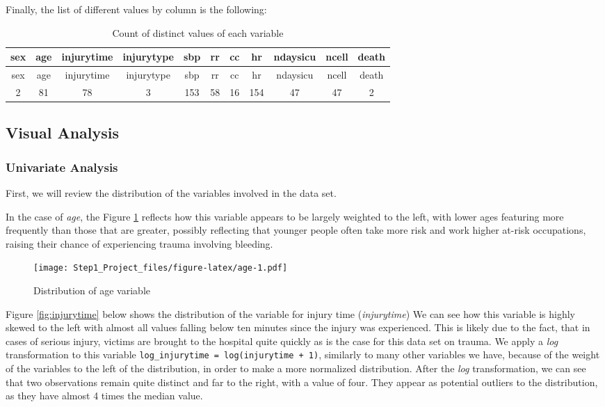 \documentclass[
]{article}
\begin{document}
Finally, the list of different values by column is the following:

\begin{longtable}[]{@{}ccccccccccc@{}}
\caption{Count of distinct values of each variable}\tabularnewline
\toprule
sex & age & injurytime & injurytype & sbp & rr & cc & hr & ndaysicu &
ncell & death\tabularnewline
\midrule
\endfirsthead
\toprule
sex & age & injurytime & injurytype & sbp & rr & cc & hr & ndaysicu &
ncell & death\tabularnewline
\midrule
\endhead
2 & 81 & 78 & 3 & 153 & 58 & 16 & 154 & 47 & 47 & 2\tabularnewline
\bottomrule
\end{longtable}

\newpage

\hypertarget{visual-analysis}{%
\subsection{Visual Analysis}\label{visual-analysis}}

\hypertarget{univariate-analysis}{%
\subsubsection{Univariate Analysis}\label{univariate-analysis}}

First, we will review the distribution of the variables involved in the
data set.

In the case of \emph{age}, the Figure \ref{fig:age} reflects how this
variable appears to be largely weighted to the left, with lower ages
featuring more frequently than those that are greater, possibly
reflecting that younger people often take more risk and work higher
at-risk occupations, raising their chance of experiencing trauma
involving bleeding.

\begin{figure}
\centering
\texttt{[image: Step1\_Project\_files/figure-latex/age-1.pdf]}
\caption{Distribution of age variable\label{fig:age}}
\end{figure}

Figure \ref{fig:injurytime} below shows the distribution of the variable
for injury time (\emph{injurytime}) We can see how this variable is
highly skewed to the left with almost all values falling below ten
minutes since the injury was experienced. This is likely due to the
fact, that in cases of serious injury, victims are brought to the
hospital quite quickly as is the case for this data set on trauma. We
apply a \emph{log} transformation to this variable
\texttt{log\_injurytime\ =\ log(injurytime\ +\ 1)}, similarly to many
other variables we have, because of the weight of the variables to the
left of the distribution, in order to make a more normalized
distribution. After the \emph{log} transformation, we can see that two
observations remain quite distinct and far to the right, with a value of
four. They appear as potential outliers to the distribution, as they
have almost 4 times the median value.
\end{document}
